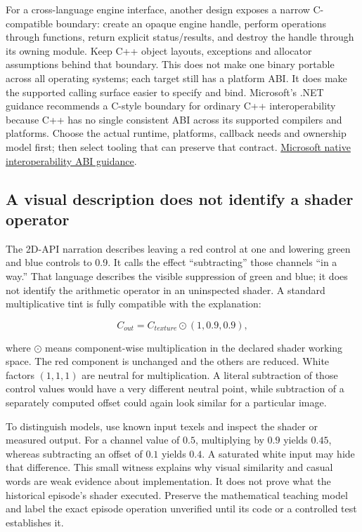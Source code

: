 For a cross-language engine interface, another design exposes a narrow C-compatible boundary: create an opaque engine handle, perform operations through functions, return explicit status/results, and destroy the handle through its owning module. Keep C++ object layouts, exceptions and allocator assumptions behind that boundary. This does not make one binary portable across all operating systems; each target still has a platform ABI. It does make the supported calling surface easier to specify and bind. Microsoft's .NET guidance recommends a C-style boundary for ordinary C++ interoperability because C++ has no single consistent ABI across its supported compilers and platforms. Choose the actual runtime, platforms, callback needs and ownership model first; then select tooling that can preserve that contract. \href{https://learn.microsoft.com/dotnet/standard/native-interop/abi-support}{Microsoft native interoperability ABI guidance}.

\subsection{A visual description does not identify a shader operator}\label{05-engine-i-ch024-a-visual-description-does-not-identify-a-shader-operator}

\hypertarget{05-engine-i-ch024-a-visual-description-does-not-identify-a-shader-operator}{}

The 2D-API narration describes leaving a red control at one and lowering green and blue controls to 0.9. It calls the effect ``subtracting'' those channels ``in a way.'' That language describes the visible suppression of green and blue; it does not identify the arithmetic operator in an uninspected shader. A standard multiplicative tint is fully compatible with the explanation:

\[
C_{out}=C_{texture}\odot(1,0.9,0.9),
\]

where \(\odot\) means component-wise multiplication in the declared shader working space. The red component is unchanged and the others are reduced. White factors \((1,1,1)\) are neutral for multiplication. A literal subtraction of those control values would have a very different neutral point, while subtraction of a separately computed offset could again look similar for a particular image.

To distinguish models, use known input texels and inspect the shader or measured output. For a channel value of \(0.5\), multiplying by \(0.9\) yields \(0.45\), whereas subtracting an offset of \(0.1\) yields \(0.4\). A saturated white input may hide that difference. This small witness explains why visual similarity and casual words are weak evidence about implementation. It does not prove what the historical episode's shader executed. Preserve the mathematical teaching model and label the exact episode operation unverified until its code or a controlled test establishes it.

